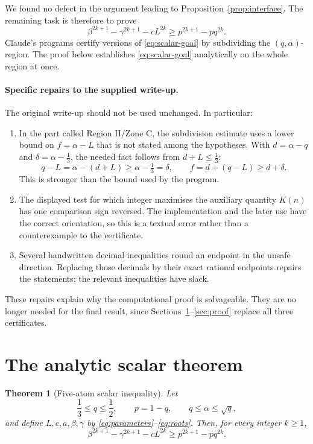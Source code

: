 \documentclass[11pt]{article}
\newtheorem{theorem}{Theorem}[section]
\theoremstyle{remark}
\begin{document}
We found no defect in the argument leading to Proposition~\ref{prop:interface}.
The remaining task is therefore to prove
\begin{equation}\label{eq:scalar-goal}
 \beta^{2k+1}-\gamma^{2k+1}-cL^{2k}
 \ge p^{2k+1}-pq^{2k}.
\end{equation}
Claude's programs certify versions of \eqref{eq:scalar-goal} by subdividing the
$(q,\alpha)$-region.  The proof below establishes \eqref{eq:scalar-goal}
analytically on the whole region at once.

\paragraph{Specific repairs to the supplied write-up.}
The original write-up should not be used unchanged.  In particular:
\begin{enumerate}[label=(\roman*),leftmargin=2.1em]
\item In the part called Region II/Zone C, the subdivision estimate uses a
lower bound on $f=\alpha-L$ that is not stated among the hypotheses.  With
$d=\alpha-q$ and $\delta=\alpha-\tfrac13$, the needed fact follows from
$d+L\le\tfrac13$:
\begin{equation}\label{eq:missing-bound}
 q-L=\alpha-(d+L)\ge\alpha-\tfrac13=\delta,
 \qquad
 f=d+(q-L)\ge d+\delta.
\end{equation}
This is stronger than the bound used by the program.
\item The displayed test for which integer maximises the auxiliary quantity
$K(n)$ has one comparison sign reversed.  The implementation and the later
use have the correct orientation, so this is a textual error rather than a
counterexample to the certificate.
\item Several handwritten decimal inequalities round an endpoint in the
unsafe direction.  Replacing those decimals by their exact rational endpoints
repairs the statements; the relevant inequalities have slack.
\end{enumerate}
These repairs explain why the computational proof is salvageable.  They are no
longer needed for the final result, since Sections~\ref{sec:scalar}--\ref{sec:proof}
replace all three certificates.

\section{The analytic scalar theorem}\label{sec:scalar}

\begin{theorem}[Five-atom scalar inequality]\label{thm:scalar}
Let
\[
 \frac13\le q\le\frac12,\qquad p=1-q,
 \qquad q\le\alpha\le\sqrt q,
\]
and define $L,c,a,\beta,\gamma$ by
\eqref{eq:parameters}--\eqref{eq:roots}.  Then, for every integer $k\ge1$,
\begin{equation}\label{eq:scalar-theorem}
 \beta^{2k+1}-\gamma^{2k+1}-cL^{2k}
 \ge p^{2k+1}-pq^{2k}.
\end{equation}
\end{theorem}
\end{document}
